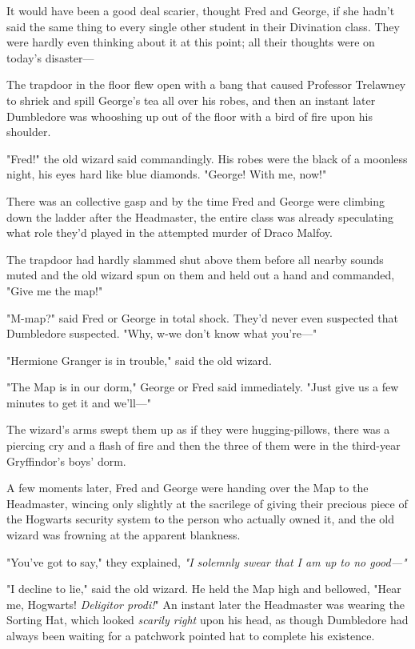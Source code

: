 It would have been a good deal scarier, thought Fred and George, if she hadn't
said the same thing to every single other student in their Divination class.
They were hardly even thinking about it at this point; all their thoughts were
on today's disaster\mbox{---}

The trapdoor in the floor flew open with a bang that caused Professor Trelawney
to shriek and spill George's tea all over his robes, and then an instant later
Dumbledore was whooshing up out of the floor with a bird of fire upon his
shoulder.

"Fred!" the old wizard said commandingly. His robes were the black of a
moonless night, his eyes hard like blue diamonds. "George! With me, now!"

There was an collective gasp and by the time Fred and George were climbing down
the ladder after the Headmaster, the entire class was already speculating what
role they'd played in the attempted murder of Draco Malfoy.

The trapdoor had hardly slammed shut above them before all nearby sounds muted
and the old wizard spun on them and held out a hand and commanded, "Give me the
map!"

"M-map?" said Fred or George in total shock. They'd never even suspected that
Dumbledore suspected. "Why, w-we don't know what you're\mbox{---}"

"Hermione Granger is in trouble," said the old wizard.

"The Map is in our dorm," George or Fred said immediately. "Just give us a few
minutes to get it and we'll\mbox{---}"

The wizard's arms swept them up as if they were hugging-pillows, there was a
piercing cry and a flash of fire and then the three of them were in the
third-year Gryffindor's boys' dorm.

A few moments later, Fred and George were handing over the Map to the
Headmaster, wincing only slightly at the sacrilege of giving their precious
piece of the Hogwarts security system to the person who actually owned it, and
the old wizard was frowning at the apparent blankness.

"You've got to say," they explained, \emph{"I solemnly swear that I am up to no
good\mbox{---}"}

"I decline to lie," said the old wizard. He held the Map high and bellowed,
"Hear me, Hogwarts! \emph{Deligitor prodi!}" An instant later the Headmaster
was wearing the Sorting Hat, which looked \emph{scarily right} upon his head,
as though Dumbledore had always been waiting for a patchwork pointed hat to
complete his existence.

